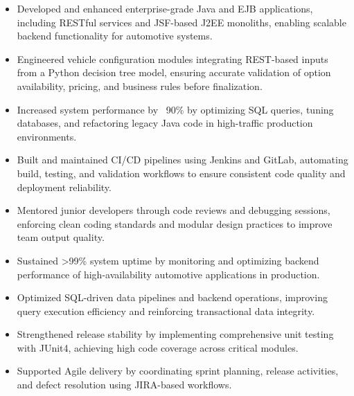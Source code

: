 \documentclass[11pt]{article}
\begin{document}
\begin{itemize}[leftmargin=15pt,itemsep=-6pt]
\item Developed and enhanced enterprise-grade Java and EJB applications, including RESTful services and JSF-based J2EE monoliths, enabling scalable backend functionality for automotive systems.
\item Engineered vehicle configuration modules integrating REST-based inputs from a Python decision tree model, ensuring accurate validation of option availability, pricing, and business rules before finalization.
\item Increased system performance by ~90\% by optimizing SQL queries, tuning databases, and refactoring legacy Java code in high-traffic production environments.
\item Built and maintained CI/CD pipelines using Jenkins and GitLab, automating build, testing, and validation workflows to ensure consistent code quality and deployment reliability.
\item Mentored junior developers through code reviews and debugging sessions, enforcing clean coding standards and modular design practices to improve team output quality.
\item Sustained >99\% system uptime by monitoring and optimizing backend performance of high-availability automotive applications in production.
\item Optimized SQL-driven data pipelines and backend operations, improving query execution efficiency and reinforcing transactional data integrity.
\item Strengthened release stability by implementing comprehensive unit testing with JUnit4, achieving high code coverage across critical modules.
\item Supported Agile delivery by coordinating sprint planning, release activities, and defect resolution using JIRA-based workflows.
\end{itemize}
\end{document}
